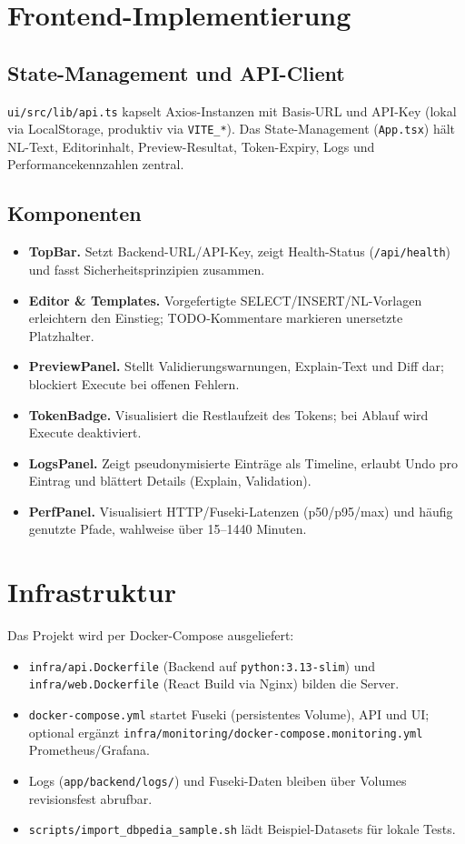 \section{Frontend-Implementierung}

\subsection{State-Management und API-Client}
\texttt{ui/src/lib/api.ts} kapselt Axios-Instanzen mit Basis-URL und API-Key (lokal via LocalStorage, produktiv via \texttt{VITE\_*}). Das State-Management (\texttt{App.tsx}) hält NL-Text, Editorinhalt, Preview-Resultat, Token-Expiry, Logs und Performancekennzahlen zentral.

\subsection{Komponenten}
\begin{itemize}
  \item \textbf{TopBar.} Setzt Backend-URL/API-Key, zeigt Health-Status (\texttt{/api/health}) und fasst Sicherheitsprinzipien zusammen.
  \item \textbf{Editor \& Templates.} Vorgefertigte SELECT/INSERT/NL-Vorlagen erleichtern den Einstieg; TODO-Kommentare markieren unersetzte Platzhalter.
  \item \textbf{PreviewPanel.} Stellt Validierungswarnungen, Explain-Text und Diff dar; blockiert Execute bei offenen Fehlern.
  \item \textbf{TokenBadge.} Visualisiert die Restlaufzeit des Tokens; bei Ablauf wird Execute deaktiviert.
  \item \textbf{LogsPanel.} Zeigt pseudonymisierte Einträge als Timeline, erlaubt Undo pro Eintrag und blättert Details (Explain, Validation).
  \item \textbf{PerfPanel.} Visualisiert HTTP/Fuseki-Latenzen (p50/p95/max) und häufig genutzte Pfade, wahlweise über 15–1440 Minuten.
\end{itemize}

\section{Infrastruktur}
Das Projekt wird per Docker-Compose ausgeliefert:
\begin{itemize}
  \item \texttt{infra/api.Dockerfile} (Backend auf \texttt{python:3.13-slim}) und \texttt{infra/web.Dockerfile} (React Build via Nginx) bilden die Server.
  \item \texttt{docker-compose.yml} startet Fuseki (persistentes Volume), API und UI; optional ergänzt \texttt{infra/monitoring/docker-compose.monitoring.yml} Prometheus/Grafana.
  \item Logs (\texttt{app/backend/logs/}) und Fuseki-Daten bleiben über Volumes revisionsfest abrufbar.
  \item \texttt{scripts/import\_dbpedia\_sample.sh} lädt Beispiel-Datasets für lokale Tests.
\end{itemize}

